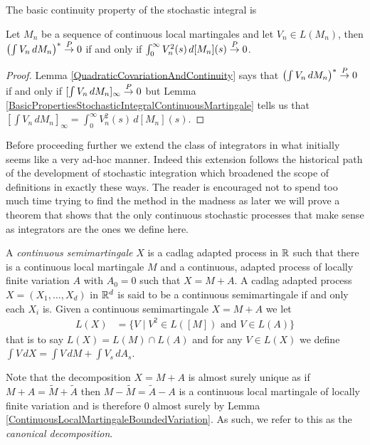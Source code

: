 The basic continuity property of the stochastic integral is
\begin{lem}\label{LimitsOfStochasticIntegralContinuousLocalMartingale}Let $M_n$ be a sequence of continuous local martingales and let $V_n \in L(M_n)$, then 
$\left( \int V_n \, dM_n \right)^* \overset{P}\to 0$ if and only if $\int_0^\infty V_n^2(s) \, d[M_n](s) \overset{P}\to 0$.
\end{lem}
\begin{proof}
Lemma \ref{QuadraticCovariationAndContinuity} says that $\left( \int V_n \, dM_n \right)^* \overset{P}\to 0$ if and only if $[\int V_n \, dM_n]_\infty \overset{P}\to 0$ but Lemma \ref{BasicPropertiesStochasticIntegralContinuousMartingale} tells us that $[\int V_n \, dM_n]_\infty = \int_0^\infty V^2_n(s) \, d[M_n](s)$. 
\end{proof}

Before proceeding further we extend the class of integrators in what initially seems like a very ad-hoc manner.  Indeed this extension follows the historical path of the development of stochastic integration which broadened the scope of definitions in exactly these ways.  The reader is encouraged not to spend too much time trying to find the method in the madness as later we will prove a theorem that shows that the only continuous stochastic processes that make sense as integrators are the ones we define here.
\begin{defn}A \emph{continuous  semimartingale} $X$ is a cadlag adapted process in $\mathbb{R}$ such that there is a continuous local martingale $M$ and a continuous, adapted process of locally finite variation $A$ with $A_0 = 0$ such that $X = M + A$.  A cadlag adapted process $X=(X_1, \dotsc, X_d)$ in $\mathbb{R}^d$ is said to be a continuous semimartingale if and only each $X_i$ is.  Given a continuous semimartingale $X = M + A$ we let 
\begin{align*}
L(X) &= \lbrace V \mid V^2 \in L([M]) \text{ and } V \in L(A) \rbrace
\end{align*}
that is to say $L(X) = L(M) \cap L(A)$ and for any $V \in L(X)$ we define $\int V \, dX = \int V \, dM + \int V_s \, dA_s$.
\end{defn} 
Note that the decomposition $X = M + A$ is almost surely unique as if $M + A = \tilde{M} + \tilde{A}$ then $M - \tilde{M} = \tilde{A} - A$ is a continuous local martingale of locally finite variation and is therefore $0$ almost surely by Lemma \ref{ContinuousLocalMartingaleBoundedVariation}.  As such, we refer to this as the \emph{canonical decomposition}.

